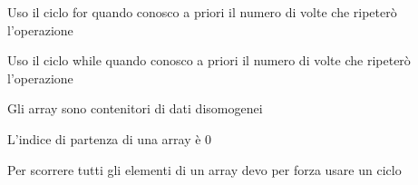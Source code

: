\documentclass[addpoints]{exam}
\newcommand{\tf}[1][{}]{%
	\fillin[#1][0.25in]%
}
\begin{document}
\begin{multicols}{2}
\begin{questions}
\question \tf[T] Uso il ciclo for quando conosco a priori il numero di volte che ripeterò l'operazione

\question \tf[F] Uso il ciclo while quando conosco a priori il numero di volte che ripeterò l'operazione 

\question \tf[F] Gli array sono contenitori di dati disomogenei

\question \tf[T] L'indice di partenza di una array è 0

\question \tf[T] Per scorrere tutti gli elementi di un array devo per forza usare un ciclo


\end{questions}
\end{multicols}
\end{document}
